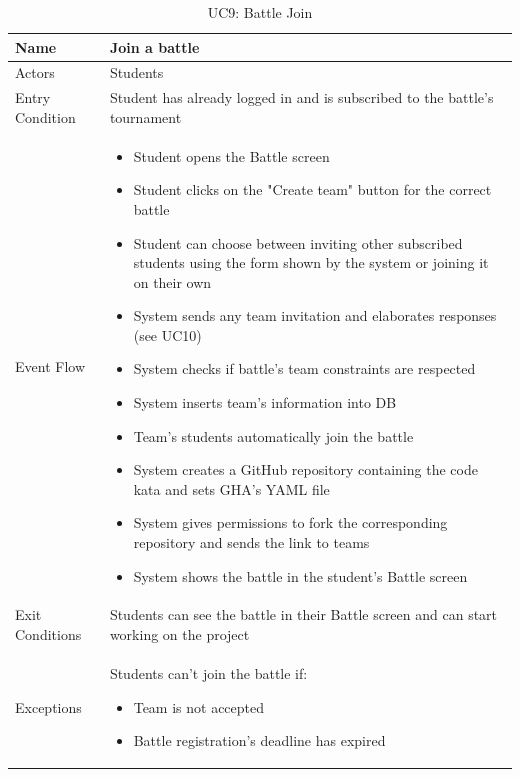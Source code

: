 \begin{enumerate}
   \begin{table}[H]
       \centering
       \begin{tabular}{|l|m{11cm}|}
        \hline
            Name & Join a battle\\
        \hline
            Actors & Students\\
        \hline
            Entry Condition & Student has already logged in and is subscribed to the battle's tournament\\
        \hline
            Event Flow & 
            \begin{itemize}
                \item Student opens the Battle screen
                \item Student clicks on the "Create team" button for the correct battle
                \item Student can choose between inviting other subscribed students using the form shown by the system or joining it on their own
                \item System sends any team invitation and elaborates responses (see UC10)
                \item System checks if battle's team constraints are respected
                \item System inserts team's information into DB
                \item Team's students automatically join the battle
                \item System creates a GitHub repository containing the code kata and sets GHA's YAML file
                \item System gives permissions to fork the corresponding repository and sends the link to teams
                \item System shows the battle in the student's Battle screen                
            \end{itemize}\\
        \hline
            Exit Conditions & Students can see the battle in their Battle screen and can start working on the project\\
        \hline
            Exceptions & Students can't join the battle if: 
            \begin{itemize}
                \item Team is not accepted
                \item Battle registration's deadline has expired
            \end{itemize}\\
        \hline
       \end{tabular}
       \caption{UC9: Battle Join}
       \label{tab:uc9}
   \end{table}



\end{enumerate}

